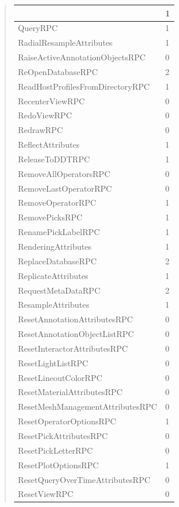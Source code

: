 \documentclass[letterpaper,10pt,english]{sphinxmanual}
\begin{document}
\begin{quote}
\begin{longtable}{|l|l|}
 & 
1
\\
\hline
QueryRPC
 & 
1
\\
\hline
RadialResampleAttributes
 & 
1
\\
\hline
RaiseActiveAnnotationObjectsRPC
 & 
0
\\
\hline
ReOpenDatabaseRPC
 & 
2
\\
\hline
ReadHostProfilesFromDirectoryRPC
 & 
1
\\
\hline
RecenterViewRPC
 & 
0
\\
\hline
RedoViewRPC
 & 
0
\\
\hline
RedrawRPC
 & 
0
\\
\hline
ReflectAttributes
 & 
1
\\
\hline
ReleaseToDDTRPC
 & 
1
\\
\hline
RemoveAllOperatorsRPC
 & 
0
\\
\hline
RemoveLastOperatorRPC
 & 
0
\\
\hline
RemoveOperatorRPC
 & 
1
\\
\hline
RemovePicksRPC
 & 
1
\\
\hline
RenamePickLabelRPC
 & 
1
\\
\hline
RenderingAttributes
 & 
1
\\
\hline
ReplaceDatabaseRPC
 & 
2
\\
\hline
ReplicateAttributes
 & 
1
\\
\hline
RequestMetaDataRPC
 & 
2
\\
\hline
ResampleAttributes
 & 
1
\\
\hline
ResetAnnotationAttributesRPC
 & 
0
\\
\hline
ResetAnnotationObjectListRPC
 & 
0
\\
\hline
ResetInteractorAttributesRPC
 & 
0
\\
\hline
ResetLightListRPC
 & 
0
\\
\hline
ResetLineoutColorRPC
 & 
0
\\
\hline
ResetMaterialAttributesRPC
 & 
0
\\
\hline
ResetMeshManagementAttributesRPC
 & 
0
\\
\hline
ResetOperatorOptionsRPC
 & 
1
\\
\hline
ResetPickAttributesRPC
 & 
0
\\
\hline
ResetPickLetterRPC
 & 
0
\\
\hline
ResetPlotOptionsRPC
 & 
1
\\
\hline
ResetQueryOverTimeAttributesRPC
 & 
0
\\
\hline
ResetViewRPC
 & 
0
\\
\hline

\end{longtable}
\end{quote}
\end{document}

